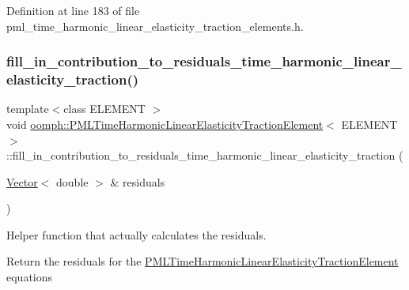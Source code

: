 Definition at line 183 of file pml\+\_\+time\+\_\+harmonic\+\_\+linear\+\_\+elasticity\+\_\+traction\+\_\+elements.\+h.

\mbox{\label{classoomph_1_1PMLTimeHarmonicLinearElasticityTractionElement_a4ac424a9a0f3c1dd67cf22669b3c63cb}} 
\subsubsection{\texorpdfstring{fill\+\_\+in\+\_\+contribution\+\_\+to\+\_\+residuals\+\_\+time\+\_\+harmonic\+\_\+linear\+\_\+elasticity\+\_\+traction()}{fill\_in\_contribution\_to\_residuals\_time\_harmonic\_linear\_elasticity\_traction()}}
{\footnotesize\ttfamily template$<$class E\+L\+E\+M\+E\+NT $>$ \\
void \hyperlink{classoomph_1_1PMLTimeHarmonicLinearElasticityTractionElement}{oomph\+::\+P\+M\+L\+Time\+Harmonic\+Linear\+Elasticity\+Traction\+Element}$<$ E\+L\+E\+M\+E\+NT $>$\+::fill\+\_\+in\+\_\+contribution\+\_\+to\+\_\+residuals\+\_\+time\+\_\+harmonic\+\_\+linear\+\_\+elasticity\+\_\+traction (\begin{DoxyParamCaption}\item[{\hyperlink{classoomph_1_1Vector}{Vector}$<$ double $>$ \&}]{residuals }\end{DoxyParamCaption})\hspace{0.3cm}{\ttfamily [protected]}}



Helper function that actually calculates the residuals. 

Return the residuals for the \hyperlink{classoomph_1_1PMLTimeHarmonicLinearElasticityTractionElement}{P\+M\+L\+Time\+Harmonic\+Linear\+Elasticity\+Traction\+Element} equations 

